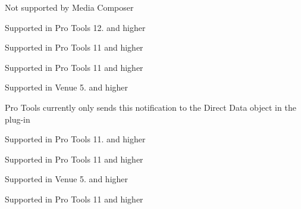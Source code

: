 \begin{DoxyRefList}
Not supported by Media Composer 
\item[Member \mbox{\hyperlink{a00503_afab5ea2cfd731fc8f163b6caa685406ea3336fd8cb2428399ab640ee91582c626}{AAX\+\_\+e\+Notification\+Event\+\_\+\+Delay\+Compensation\+State}} ]\label{a00801__compatibility_notes000042}%
%
 Supported in Pro Tools 12. and higher 
\item[Member \mbox{\hyperlink{a00503_afab5ea2cfd731fc8f163b6caa685406eacb91c4b0d87f576d27da721ebce4bf37}{AAX\+\_\+e\+Notification\+Event\+\_\+\+Entering\+Offline\+Mode}} ]\label{a00801__compatibility_notes000038}%
%
 Supported in Pro Tools 11 and higher 
\item[Member \mbox{\hyperlink{a00503_afab5ea2cfd731fc8f163b6caa685406ea69594361a5f845b0275bcd7e953d1b25}{AAX\+\_\+e\+Notification\+Event\+\_\+\+Exiting\+Offline\+Mode}} ]\label{a00801__compatibility_notes000039}%
%
 Supported in Pro Tools 11 and higher 
\item[Member \mbox{\hyperlink{a00503_afab5ea2cfd731fc8f163b6caa685406ea59ab8642f090b5ae21385982a1ffaa7b}{AAX\+\_\+e\+Notification\+Event\+\_\+\+Host\+Mode\+Changed}} ]\label{a00801__compatibility_notes000046}%
%
 Supported in Venue 5. and higher 
\item[Member \mbox{\hyperlink{a00503_afab5ea2cfd731fc8f163b6caa685406ea03306ffe8c87fe3706c1c73df1a158e7}{AAX\+\_\+e\+Notification\+Event\+\_\+\+Log\+State}} ]\label{a00801__compatibility_notes000048}%
%
 Pro Tools currently only sends this notification to the Direct Data object in the plug-\/in 
\item[Member \mbox{\hyperlink{a00503_afab5ea2cfd731fc8f163b6caa685406ea74ab285136093261fd246572659f119c}{AAX\+\_\+e\+Notification\+Event\+\_\+\+Max\+View\+Size\+Changed}} ]\label{a00801__compatibility_notes000043}%
%
 Supported in Pro Tools 11. and higher 
\item[Member \mbox{\hyperlink{a00503_afab5ea2cfd731fc8f163b6caa685406eae80fd29dd36171bc1eb02b30e30825da}{AAX\+\_\+e\+Notification\+Event\+\_\+\+Preset\+Opened}} ]\label{a00801__compatibility_notes000037}%
%
 Supported in Pro Tools 11 and higher 
\item[Member \mbox{\hyperlink{a00503_afab5ea2cfd731fc8f163b6caa685406ea40644990a3de0fec1f25929b535f7760}{AAX\+\_\+e\+Notification\+Event\+\_\+\+Prior\+Settings\+Invalid}} ]\label{a00801__compatibility_notes000047}%
%
 Supported in Venue 5. and higher 
\item[Member \mbox{\hyperlink{a00503_afab5ea2cfd731fc8f163b6caa685406ea013a21c2c111bac54b962b40f1b4bc1f}{AAX\+\_\+e\+Notification\+Event\+\_\+\+Session\+Being\+Opened}} ]\label{a00801__compatibility_notes000036}%
%
 Supported in Pro Tools 11 and higher 


\end{DoxyRefList}
